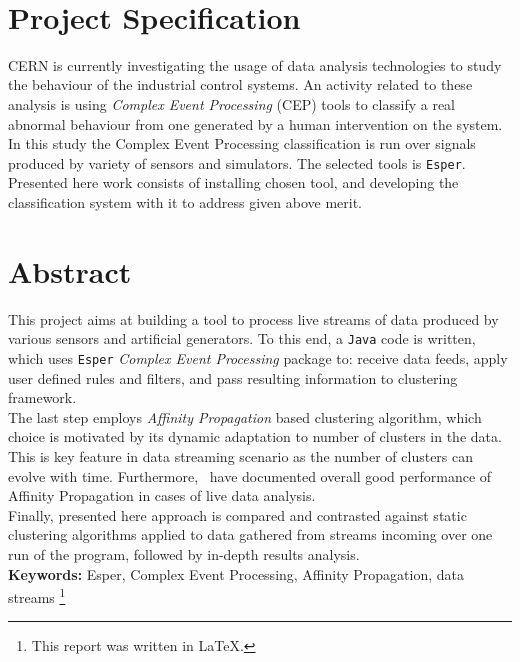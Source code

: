 \documentclass[11pt, letterpaper]{article}            %
\begin{document}
~
\thispagestyle{empty}\newpage

\section*{Project Specification}
CERN is currently investigating the usage of data analysis technologies to study the behaviour of the industrial control systems. An activity related to these analysis is using \emph{Complex Event Processing} (CEP) tools to classify a real abnormal behaviour from one generated by a human intervention on the system.\\
In this study the Complex Event Processing classification is run over signals produced by variety of sensors and simulators. The selected tools is \texttt{Esper}. Presented here work consists of installing chosen tool, and developing the classification system with it to address given above merit.
\newpage

\section*{Abstract}
This project aims at building a tool to process live streams of data produced by various sensors and artificial generators. To this end, a \texttt{Java} code is written, which uses \texttt{Esper} \emph{Complex Event Processing} package to: receive data feeds, apply user defined rules and filters, and pass resulting information to clustering framework.\\
The last step employs \emph{Affinity Propagation} based clustering algorithm, which choice is motivated by its dynamic adaptation to number of clusters in the data. This is key feature in data streaming scenario as the number of clusters can evolve with time. Furthermore,~\citep{zhang2013data} have documented overall good performance of Affinity Propagation in cases of live data analysis.\\
Finally, presented here approach is compared and contrasted against static clustering algorithms applied to data gathered from streams incoming over one run of the program, followed by in-depth results analysis.\\[1cm]
\textbf{Keywords:} Esper, Complex Event Processing, Affinity Propagation, data streams
\let\thefootnote\relax\footnote{\noindent This report was written in \LaTeX.}\\
\newpage

{\fontsize{11}{13}\sffamily\linespread{1.750}\selectfont\tableofcontents}
\thispagestyle{fancy}\newpage
\end{document}

